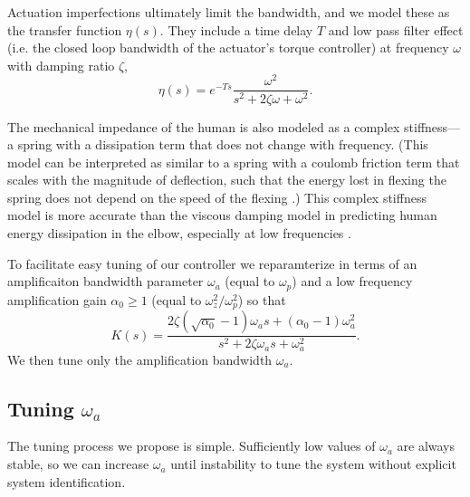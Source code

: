 \documentclass[utf8]{frontiersSCNS}
\renewcommand*{\cite}[1]{\citep{#1}}
\begin{document}
Actuation imperfections ultimately limit the bandwidth, and we model these as the transfer function $\eta(s)$. They include a time delay $T$ and low pass filter effect (i.e. the closed loop bandwidth of the actuator's torque controller) at frequency $\omega$ with damping ratio $\zeta$,
\begin{equation}
\eta(s) = e^{-Ts} \frac{\omega^2}{s^2+2\zeta\omega + \omega^2}.
\end{equation}

The mechanical impedance of the human is also modeled as a complex stiffness---a spring with a dissipation term that does not change with frequency. (This model can be interpreted as similar to a spring with a coulomb friction term that scales with the magnitude of deflection, such that the energy lost in flexing the spring does not depend on the speed of the flexing \cite{BrissonneauHeThomasSentis2021CSL}.) This complex stiffness model is more accurate than the viscous damping model in predicting human energy dissipation in the elbow, especially at low frequencies  \cite{HeHuangThomasSentis2020TNSRE}.

To facilitate easy tuning of our controller we reparamterize in terms of an amplificaiton bandwidth parameter $\omega_a$ (equal to $\omega_p$) and a low frequency amplification gain $\alpha_0\geq1$ (equal to $\omega_z^2/\omega_p^2$) so that
\begin{equation}
K(s) = \frac{2\zeta (\sqrt{\alpha_0}-1)\omega_a s + (\alpha_0-1)\omega_a^2}{s^2 + 2\zeta \omega_a s + \omega_a^2}.
\end{equation}
We then tune only the amplification bandwidth $\omega_a$.


\subsection{Tuning $\omega_a$}
The tuning process we propose is simple. Sufficiently low values of $\omega_a$ are always stable, so we can increase $\omega_a$ until instability to tune the system without explicit system identification.
\end{document}
